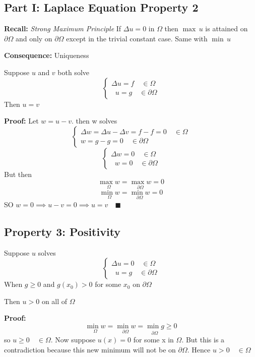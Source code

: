 \documentclass[12pt]{article}
\begin{document}
\subsection*{Part I: Laplace Equation Property 2}
\textbf{Recall:} \emph{Strong Maximum Principle}
If $\Delta u = 0$ in $\Omega$ then $\max\, u$ is attained on $\partial \Omega$ and only on $\partial \Omega$ except in the trivial constant case. Same with $\min \, u$

\textbf{Consequence:} Uniqueness 

Suppose $u$ and $v$ both solve 
\[\begin{cases}
    \Delta u = f \quad \in \Omega\\
    \;\; u = g \quad \in \partial \Omega
\end{cases}\]
Then $u = v$

\textbf{Proof:} Let $w = u - v$. then w solves 
\[\begin{cases}
    \Delta w = \Delta u - \Delta v = f - f = 0 \quad \in \Omega\\
    w = g - g = 0 \quad \in \partial \Omega
\end{cases}\]
\[\begin{cases}
    \Delta w = 0 \quad \in \Omega\\
    \;\; w = 0 \quad \in \partial \Omega
\end{cases}\]
But then 
\[\underset{\Omega}{\max w} = \underset{\partial \Omega}{\max w} = 0\]
\[\underset{\Omega}{\min w} = \underset{\partial \Omega}{\min w} = 0\]
SO $w = 0 \implies u - v = 0 \implies u = v \quad \blacksquare$

\subsection*{Property 3: Positivity}
Suppose $u$ solves
\[\begin{cases}
    \Delta u = 0 \quad \in \Omega\\
    \;\; u = g \quad \in \partial \Omega
\end{cases}\]
When $g \geq 0$ and $g(x_0) > 0$ for some $x_0$ on $\partial \Omega$

Then $u > 0$ on all of $\Omega$

\textbf{Proof:}
\[\underset{\Omega}{\min w} = \underset{\partial \Omega}{\min w} = \underset{\partial \Omega}{\min g} \geq 0\]
so $u \geq 0 \quad \in \Omega$. 
Now suppose $u(x) = 0$ for some x in $\Omega$. But this is a contradiction because this new minimum will not be on $\partial \Omega.$ Hence $u > 0 \quad \in \Omega$
\end{document}
